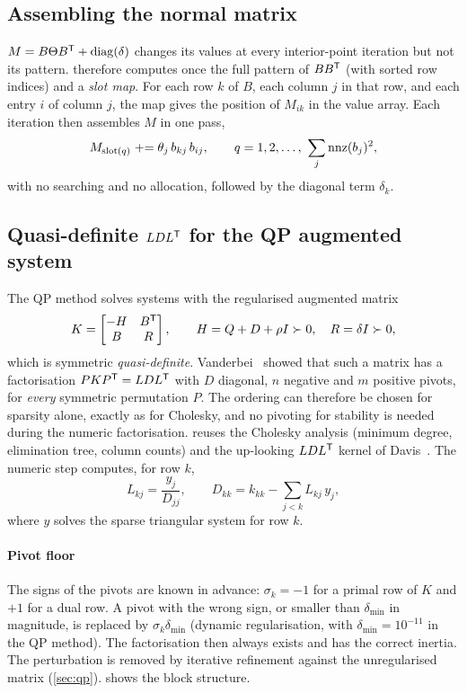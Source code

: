 \subsection{Assembling the normal matrix}\label{sec:normal}
$M = B\Theta B^{\mathsf{T}} + \operatorname{diag}(\delta)$ changes its values at every interior-point iteration but not its
pattern.  therefore computes once the full pattern of $BB^{\mathsf{T}}$ (with sorted
row indices) and a \emph{slot map}. For each row $k$ of $B$, each column $j$ in that row, and each
entry $i$ of column $j$, the map gives the position of $M_{ik}$ in the value array. Each
iteration then assembles $M$ in one pass,
\begin{equation}\label{eq:assemble}
  M_{\text{slot}(q)} \mathrel{+}= \theta_j\, b_{kj}\, b_{ij},\qquad q=1,2,\dots,\ \sum_j \operatorname{nnz}(b_j)^2 ,
\end{equation}
with no searching and no allocation, followed by the diagonal term $\delta_k$.

\subsection{Quasi-definite \texorpdfstring{$LDL^{\mathsf{T}}$}{LDLT} for the QP augmented system}\label{sec:ldl}
The QP method solves systems with the regularised augmented matrix
\begin{equation}\label{eq:qd}
  K=\begin{bmatrix} -H & B^{\mathsf{T}}\\ B & R\end{bmatrix},\qquad H = Q+D+\rho I\succ0,\quad R=\delta I\succ0,
\end{equation}
which is symmetric \emph{quasi-definite}. Vanderbei~\cite{vanderbei1995} showed that such a matrix
has a factorisation $PKP^{\mathsf{T}}=LDL^{\mathsf{T}}$ with $D$ diagonal, $n$ negative and $m$ positive pivots, for
\emph{every} symmetric permutation $P$. The ordering can therefore be chosen for sparsity alone,
exactly as for Cholesky, and no pivoting for stability is needed during the numeric
factorisation.  reuses the Cholesky analysis (minimum degree, elimination tree,
column counts) and the up-looking $LDL^{\mathsf{T}}$ kernel of Davis~\cite{davis2005}. The numeric step computes,
for row $k$,
\begin{equation}\label{eq:ldl}
  L_{kj} = \frac{y_j}{D_{jj}},\qquad D_{kk} = k_{kk} - \sum_{j<k} L_{kj}\,y_j ,
\end{equation}
where $y$ solves the sparse triangular system for row $k$.

\paragraph{Pivot floor}
The signs of the pivots are known in advance: $\sigma_k=-1$ for a primal row of $K$ and $+1$ for a
dual row. A pivot with the wrong sign, or smaller than $\delta_{\min}$ in magnitude, is replaced by
$\sigma_k\delta_{\min}$ (dynamic regularisation, with $\delta_{\min}=10^{-11}$ in the QP method). The
factorisation then always exists and has the correct inertia. The perturbation is removed by
iterative refinement against the unregularised matrix (\cref{sec:qp}).  shows the
block structure.

